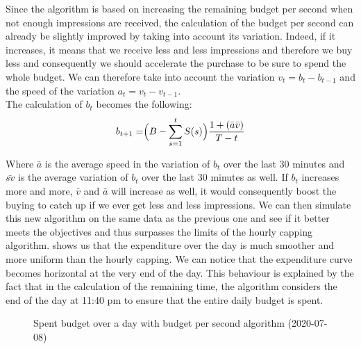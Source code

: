 \documentclass[12pt]{article}
\begin{document}
Since the algorithm is based on increasing the remaining budget per second when not enough impressions are received, the calculation of the budget per second can already be slightly improved by taking into account its variation. Indeed, if it increases, it means that we receive less and less impressions and therefore we buy less and consequently we should accelerate the purchase to be sure to spend the whole budget. We can therefore take into account the variation $v_t = b_t - b_{t-1}$ and the speed of the variation $a_t = v_t - v_{t-1}$. \\
The calculation of $b_t$ becomes the following:
$$b_{t+1} = \Bigr(B - \displaystyle \sum_{s=1}^{t} S(s)\Bigl) \dfrac{1 + (\bar{a}\bar{v})}{T-t}$$

Where $\bar{a}$ is the average speed in the variation of $b_t$ over the last 30 minutes and $\bar{sv}$ is the average variation of $b_t$ over the last 30 minutes as well. If $b_t$ increases more and more, $\bar{v}$ and $\bar{a}$ will increase as well, it would consequently boost the buying to catch up if we ever get less and less impressions. We can then simulate this new algorithm on the same data as the previous one and see if it better meets the objectives and thus surpasses the limits of the hourly capping algorithm.  shows us that the expenditure over the day is much smoother and more uniform than the hourly capping. We can notice that the expenditure curve becomes horizontal at the very end of the day. This behaviour is explained by the fact that in the calculation of the remaining time, the algorithm considers the end of the day at 11:40 pm to ensure that the entire daily budget is spent. 

\begin{figure}[h!]
	\centering
	\caption{Spent budget over a day with budget per second algorithm (2020-07-08)}
	\label{good_bt}
\end{figure}
\end{document}
